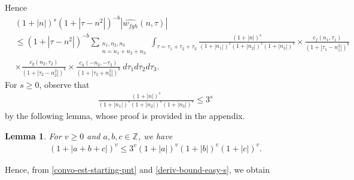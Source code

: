 \documentclass[12pt,reqno]{amsart}
\numberwithin{equation}{section}  %
\numberwithin{figure}{section}
\newcommand{\zz}{\mathbb{Z}}
\newcommand{\wh}{\widehat}
\theoremstyle{plain}
\newtheorem{lemma}{Lemma}
\theoremstyle{definition}
\theoremstyle{remark}
\begin{document}
%
%
Hence
%
%
\begin{equation}
	\label{convo-est-starting-pnt}
	\begin{split}
		 & \left (1 + |n| \right )^s \left( 1 + | \tau - n^2 | \right)^{-b} | \wh{w_{fgh}}\left( 
		n, \tau \right) |
		\\
		& \le \left( 1 + | \tau - n^2 | \right)^{-b}
		\sum_{\substack{n_1,n_2,n_3\\n = n_1 + n_2 + n_3}} \int_{\tau=\tau_1 + \tau_2 + \tau_3} \frac{\left (1 + |n| \right )^s}{\left (1 +
		|n_1| \right )^s \left (1 + | n_2| \right )^s \left (1 + |n_3| \right )^s} 
		\times \frac{c_f(n_1, \tau_1)}{\left( 1 + | \tau_1 - n_1^2 | 
		\right)^{b}}
		\\
		& \times
		\frac{c_g(n_2, \tau_2)}{\left( 1 + | \tau_2 - n_2^2 | 
		\right)^{b}} \times
		\frac{c_h(-n_3, -\tau_3)}{\left( 1 + | \tau_3 + n_3^2 | 
		\right)^{b}}\ d \tau_1 d \tau_2 d \tau_3.
	\end{split}
\end{equation}
%
%
For $s \ge 0$, observe that
%
%
\begin{equation}
	\label{deriv-bound-easy-s}
	\begin{split}
		\frac{\left (1 + |n| \right ) ^s}{\left (1 + |n_1| \right ) ^s \left (1 + |n_2| \right ) ^s \left (1 + |n_3| \right ) ^s} 
		\le 3^{s}
	\end{split}
\end{equation}
%
%
by the following lemma, whose proof is provided in the appendix.
%
%
\begin{lemma}
\label{lem:splitting}
	For $v \ge 0$ and $a, b, c \in \zz$, we have
%
%
\begin{equation}
	\label{splitting}
	\begin{split}
		\left ( 1 + |a +b + c| \right)^v \le 3^v \left(1 + | a | \right)^v \left(
		1 + | b | \right)^v \left( 1 + | c | \right)^v.
	\end{split}
\end{equation}
%
%
\end{lemma}
%
%
Hence, from \eqref{convo-est-starting-pnt} and \eqref{deriv-bound-easy-s}, we 
obtain
%
\end{document}
